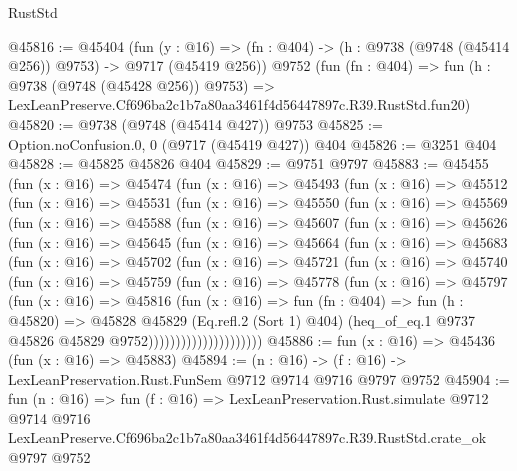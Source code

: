 \begin{lexlean}{RustStd}
\begin{coremodule}
@45816 := @45404
    (fun (y : @16) => (fn : @404) -> (h : @9738 (@9748 (@45414 @256)) @9753) -> @9717 (@45419 @256))
    @9752
    (fun (fn : @404) =>
    fun (h : @9738 (@9748 (@45428 @256)) @9753) =>
    LexLeanPreserve.Cf696ba2c1b7a80aa3461f4d56447897c.R39.RustStd.fun20)
@45820 := @9738 (@9748 (@45414 @427)) @9753
@45825 := Option.noConfusion.{0, 0} (@9717 (@45419 @427)) @404
@45826 := @3251 @404
@45828 := @45825 @45826 @404
@45829 := @9751 @9797
@45883 := @45455
    (fun (x : @16) =>
    @45474
      (fun (x : @16) =>
      @45493
        (fun (x : @16) =>
        @45512
          (fun (x : @16) =>
          @45531
            (fun (x : @16) =>
            @45550
              (fun (x : @16) =>
              @45569
                (fun (x : @16) =>
                @45588
                  (fun (x : @16) =>
                  @45607
                    (fun (x : @16) =>
                    @45626
                      (fun (x : @16) =>
                      @45645
                        (fun (x : @16) =>
                        @45664
                          (fun (x : @16) =>
                          @45683
                            (fun (x : @16) =>
                            @45702
                              (fun (x : @16) =>
                              @45721
                                (fun (x : @16) =>
                                @45740
                                  (fun (x : @16) =>
                                  @45759
                                    (fun (x : @16) =>
                                    @45778
                                      (fun (x : @16) =>
                                      @45797
                                        (fun (x : @16) =>
                                        @45816
                                          (fun (x : @16) =>
                                          fun (fn : @404) =>
                                          fun (h : @45820) =>
                                          @45828
                                            @45829
                                            (Eq.refl.{2} (Sort 1) @404)
                                            (heq_of_eq.{1}
                                              @9737
                                              @45826
                                              @45829
                                              @9752)))))))))))))))))))))
@45886 := fun (x : @16) => @45436 (fun (x : @16) => @45883)
@45894 := (n : @16) -> (f : @16) -> LexLeanPreservation.Rust.FunSem @9712 @9714 @9716 @9797 @9752
@45904 := fun (n : @16) =>
  fun (f : @16) =>
  LexLeanPreservation.Rust.simulate
    @9712
    @9714
    @9716
    LexLeanPreserve.Cf696ba2c1b7a80aa3461f4d56447897c.R39.RustStd.crate_ok
    @9797
    @9752
\end{coremodule}
\end{lexlean}

